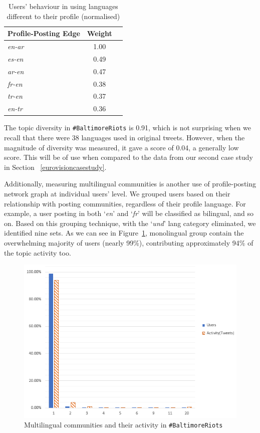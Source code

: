 \begin{table}[!htb]
\centering
\begin{tabular}{@{}lcr@{}}
\toprule
\textbf{Profile-Posting Edge} & \textbf{Weight} \\ \midrule
{\emph{en-ar}} & 1.00 \\
{\emph{es-en}} & 0.49 \\
{\emph{ar-en}} & 0.47\\ 
{\emph{fr-en}} & 0.38 \\
{\emph{tr-en}} & 0.37 \\
{\emph{en-tr}} & 0.36 \\ \bottomrule
\end{tabular}
\caption{Users' behaviour in using languages different to their profile (normalised)}
\label{tbl:baltimoredifflang}
\end{table}

The topic diversity in {\texttt{\#BaltimoreRiots}} is 0.91, which is
not surprising when we recall that there were 38 languages used in
original tweets. However, when the magnitude of diversity was
measured, it gave a score of 0.04, a generally low score. This will be
of use when compared to the data from our second case study in Section
~\ref{eurovisioncasestudy}.

Additionally, measuring multilingual communities is another use of
profile-posting network graph at individual users' level. We grouped
users based on their relationship with posting communities, regardless
of their profile language. For example, a user posting in both
`{\emph{en}}' and `{\emph{fr}}' will be classified as bilingual, and
so on. Based on this grouping technique, with the `{\emph{und}}' lang
category eliminated, we identified nine sets. As we can see in
Figure~\ref{fig:baltimore_multilingual}, monolingual group contain the
overwhelming majority of users (nearly 99\%), contributing
approximately 94\% of the topic activity too.

\begin{figure}
\centering
\includegraphics[width=\columnwidth]{images/baltimore_multilingual.png}
\caption{Multilingual communities and their activity in {\texttt{\#BaltimoreRiots}}}
\label{fig:baltimore_multilingual}
\end{figure}


